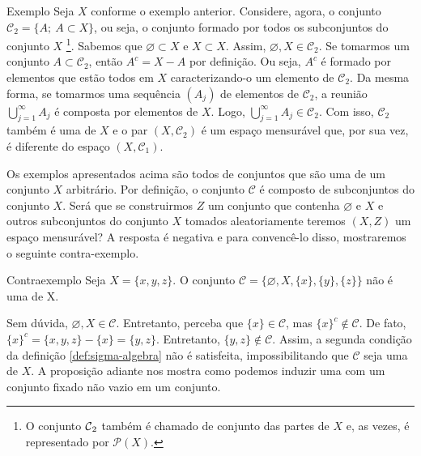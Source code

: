 \begin{resultado}{Exemplo}
	\label{ex:sigma-subconjuntos}
	Seja $X$ conforme o exemplo anterior.
	Considere, agora, o conjunto $\mathcal{C}_2 = \{ A; \ A \subset X\}$, ou seja, o conjunto formado por todos os subconjuntos do conjunto $X$
	\footnote{O conjunto $\operatorname{\mathcal{C}}_2$ também é chamado de conjunto das partes de $X$ e, as vezes, é representado por $\mathcal{P}(X)$.}.
	Sabemos que $\varnothing \subset X$ e $X \subset X$. 
	Assim, $\varnothing, X \in \mathcal{C}_2$. 
	Se tomarmos um conjunto $A \subset \mathcal{C}_2$, então $A^c = X - A$ por definição.
	Ou seja, $A^c$ é formado por elementos que estão todos em $X$ caracterizando-o um elemento de $\mathcal{C}_2$.
	Da mesma forma, se tomarmos uma sequência $(A_j)$ de elementos de $\mathcal{C}_2$, a reunião 
	$\displaystyle \bigcup_{j = 1}^\infty A_j$ é composta por elementos de $X$.
	Logo,  $\displaystyle \bigcup_{j = 1}^\infty A_j \in \mathcal{C}_2$.
	Com isso, $\mathcal{C}_2$ também é uma \sigal de $X$ e o par $(X, \mathcal{C}_2)$ é um espaço mensurável que, por sua vez, é diferente do espaço $(X,\mathcal{C}_1)$.
\end{resultado}





Os exemplos apresentados acima são todos de conjuntos que são uma \sigal de um conjunto $X$ arbitrário.
Por definição, o conjunto $\mathcal{C}$ é composto de subconjuntos do conjunto $X$. 
Será que se construirmos $Z$ um conjunto que contenha $\varnothing$ e $X$ e outros subconjuntos do conjunto $X$ tomados aleatoriamente teremos $(X,Z)$ um espaço mensurável? A resposta é negativa e para convencê-lo disso, mostraremos o seguinte contra-exemplo.

\begin{resultado}{Contraexemplo}
    Seja $X = \{x,y,z\}$. O conjunto $\mathcal{C} = \{\varnothing, X, \{x\}, \{y\}, \{z\}\}$ não é uma \sigal de X.
\end{resultado}

Sem dúvida, $\varnothing, X \in \mathcal{C}$. 
Entretanto, perceba que $\{x\} \in \mathcal{C}$, mas $\{x\}^c \notin \mathcal{C}$.
De fato, 
$
\{x\}^c
=\{x,y,z\} 
-\{x\} 
= \{y,z\}.
$
Entretanto, $\{y,z\} \notin \mathcal{C}$.
Assim, a segunda condição da definição \ref{def:sigma-algebra} não é satisfeita, impossibilitando que $\mathcal{C}$ seja uma \sigal de $X$.
A proposição adiante nos mostra como podemos induzir uma \sigal com um conjunto fixado não vazio em um conjunto.

